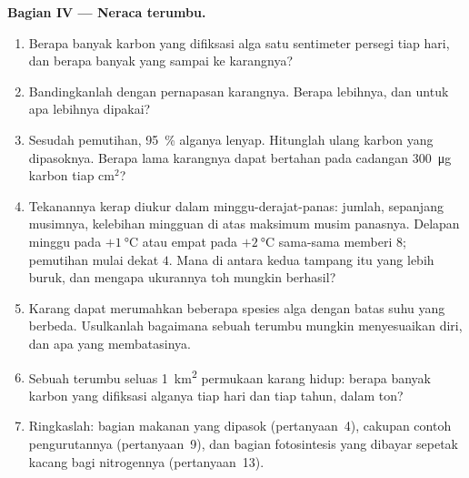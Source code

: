 \begin{problem}
\medskip
\noindent\textbf{Bagian IV --- Neraca terumbu.}
\begin{enumerate}[resume]
  \item Berapa banyak karbon yang difiksasi alga satu sentimeter persegi tiap
        hari, dan berapa banyak yang sampai ke karangnya?
  \item Bandingkanlah dengan pernapasan karangnya. Berapa lebihnya, dan
        untuk apa lebihnya dipakai?
  \item Sesudah pemutihan, \qty{95}{\%} alganya lenyap. Hitunglah ulang
        karbon yang dipasoknya. Berapa lama karangnya dapat bertahan pada
        cadangan \qty{300}{\micro g} karbon tiap cm$^{2}$?
  \item Tekanannya kerap diukur dalam minggu-derajat-panas: jumlah,
        sepanjang musimnya, kelebihan mingguan di atas maksimum musim
        panasnya. Delapan minggu pada $+\qty{1}{\celsius}$ atau empat pada
        $+\qty{2}{\celsius}$ sama-sama memberi $8$; pemutihan mulai dekat $4$.
        Mana di antara kedua tampang itu yang lebih buruk, dan mengapa
        ukurannya toh mungkin berhasil?
  \item Karang dapat merumahkan beberapa spesies alga dengan batas suhu yang
        berbeda. Usulkanlah bagaimana sebuah terumbu mungkin menyesuaikan diri,
        dan apa yang membatasinya.
  \item Sebuah terumbu seluas \qty{1}{km^2} permukaan karang hidup: berapa
        banyak karbon yang difiksasi alganya tiap hari dan tiap tahun, dalam ton?
  \item Ringkaslah: bagian makanan yang dipasok 
        (pertanyaan~4), cakupan contoh pengurutannya
        (pertanyaan~9), dan bagian fotosintesis yang dibayar sepetak kacang
        bagi nitrogennya (pertanyaan~13).
\end{enumerate}
\end{problem}
